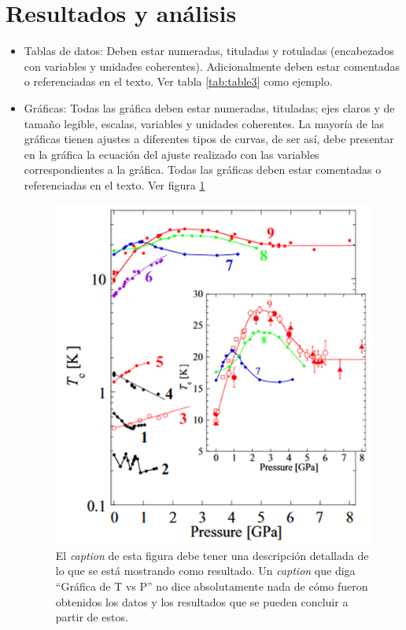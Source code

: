 \section{Resultados y análisis}

\begin{itemize}
    \item Tablas de datos: Deben estar numeradas, tituladas y rotuladas (encabezados con variables y  unidades  coherentes).  Adicionalmente  deben  estar  comentadas  o  referenciadas  en  el texto. Ver tabla \ref{tab:table3} como ejemplo. 
    \item Gráficas: Todas las gráfica deben estar numeradas, tituladas; ejes claros y de tamaño legible, escalas, variables y unidades coherentes. La mayoría de las gráficas tienen ajustes a diferentes tipos de curvas, de ser así, debe presentar en la gráfica la ecuación del ajuste realizado  con  las  variables  correspondientes  a  la  gráfica.  Todas las gráficas deben estar comentadas o referenciadas en el texto. Ver figura \ref{fig:my_label}
    
    \begin{figure}[H]
    \centering
    \includegraphics[scale=0.6]{GraphEj.png}
    \caption{El \emph{caption} de esta figura debe tener una descripción detallada de lo que se está mostrando como resultado. Un \emph{caption} que diga ``Gráfica de T vs P'' no dice absolutamente nada de cómo fueron obtenidos los datos y los resultados que se pueden concluir a partir de estos.}
    \label{fig:my_label}
    \end{figure}


\end{itemize}
